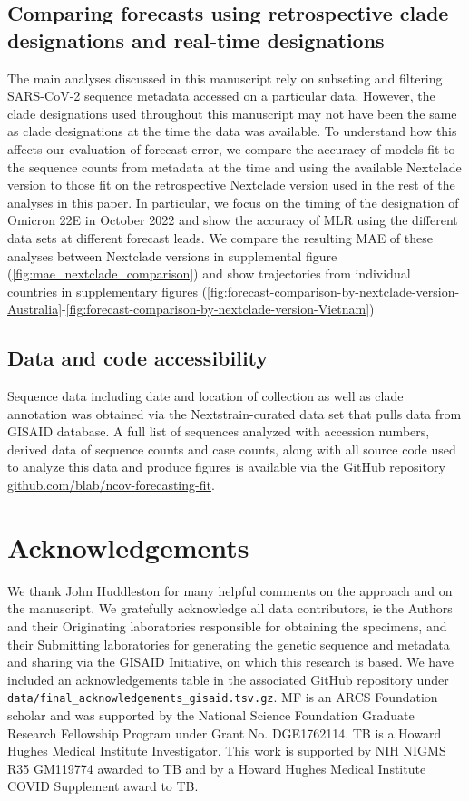 \documentclass[11pt,oneside,letterpaper]{article}
\begin{document}
\subsection*{Comparing forecasts using retrospective clade designations and real-time designations}

The main analyses discussed in this manuscript rely on subseting and filtering SARS-CoV-2 sequence metadata accessed on a particular data.
However, the clade designations used throughout this manuscript may not have been the same as clade designations at the time the data was available.
To understand how this affects our evaluation of forecast error, we compare the accuracy of models fit to the sequence counts from metadata at the time and using the available Nextclade version to those fit on the retrospective Nextclade version used in the rest of the analyses in this paper.
In particular, we focus on the timing of the designation of Omicron 22E in October 2022 and show the accuracy of MLR using the different data sets at different forecast leads.
We compare the resulting MAE of these analyses between Nextclade versions in supplemental figure (\ref{fig:mae_nextclade_comparison}) and 
show trajectories from individual countries in supplementary figures (\ref{fig:forecast-comparison-by-nextclade-version-Australia}-\ref{fig:forecast-comparison-by-nextclade-version-Vietnam})

\subsection*{Data and code accessibility}

Sequence data including date and location of collection as well as clade annotation was obtained via the Nextstrain-curated data set that pulls data from GISAID database.
A full list of sequences analyzed with accession numbers, derived data of sequence counts and case counts, along with all source code used to analyze this data and produce figures is available via the GitHub repository \href{https://github.com/blab/ncov-forecasting-fit}{github.com/blab/ncov-forecasting-fit}.

\section*{Acknowledgements}

We thank John Huddleston for many helpful comments on the approach and on the manuscript.
We gratefully acknowledge all data contributors, ie the Authors and their Originating laboratories responsible for obtaining the specimens, and their Submitting laboratories for generating the genetic sequence and metadata and sharing via the GISAID Initiative, on which this research is based.
We have included an acknowledgements table in the associated GitHub repository under \texttt{data/final\_acknowledgements\_gisaid.tsv.gz}.
MF is an ARCS Foundation scholar and was supported by the National Science Foundation Graduate Research Fellowship Program under Grant No. DGE1762114.
TB is a Howard Hughes Medical Institute Investigator.
This work is supported by NIH NIGMS R35 GM119774 awarded to TB and by a Howard Hughes Medical Institute COVID Supplement award to TB.
\end{document}
